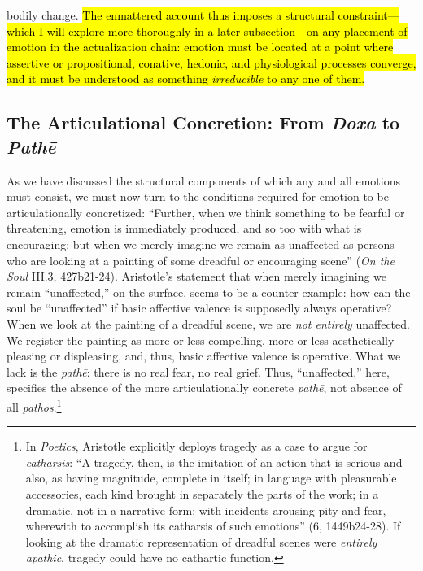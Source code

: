 \documentclass{article}
\begin{document}
bodily change. \hl{The enmattered account thus imposes a structural constraint---which I will explore more thoroughly in a later subsection---on any placement of emotion in the actualization chain: emotion must be located at a point where assertive or propositional, conative, hedonic, and physiological processes converge, and it must be understood as something \textit{irreducible} to any one of them.}

\subsection{The Articulational Concretion: From \textit{Doxa} to \textit{Pathē}}

As we have discussed the structural components of which any and all emotions must consist, we must now turn to the conditions required for emotion to be articulationally concretized: ``Further, when we think something to be fearful or threatening, emotion is immediately produced, and so too with what is encouraging; but when we merely imagine we remain as unaffected as persons who are looking at a painting of some dreadful or encouraging scene'' (\textit{On the Soul} III.3, 427b21-24). Aristotle's statement that when merely imagining we remain ``unaffected,'' on the surface, seems to be a counter-example: how can the soul be ``unaffected'' if basic affective valence is supposedly always operative? When we look at the painting of a dreadful scene, we are \textit{not entirely} unaffected. We register the painting as more or less compelling, more or less aesthetically pleasing or displeasing, and, thus, basic affective valence is operative. What we lack is the \textit{pathē}: there is no real fear, no real grief. Thus, ``unaffected,'' here, specifies the absence of the more articulationally concrete \textit{pathē}, not absence of all \textit{pathos}.\footnote{In \textit{Poetics}, Aristotle explicitly deploys tragedy as a case to argue for \textit{catharsis}: ``A tragedy, then, is the imitation of an action that is serious and also, as having magnitude, complete in itself; in language with pleasurable accessories, each kind brought in separately the parts of the work; in a dramatic, not in a narrative form; with incidents arousing pity and fear, wherewith to accomplish its catharsis of such emotions'' (6, 1449b24-28). If looking at the dramatic representation of dreadful scenes were \textit{entirely apathic}, tragedy could have no cathartic function.} 
\end{document}
